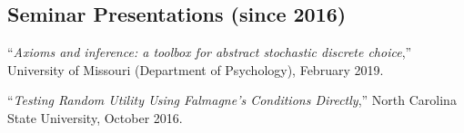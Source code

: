 \documentclass[12pt]{article}
\begin{document}




\subsection*{Seminar Presentations (since 2016)}

``{\it Axioms and inference: a toolbox for abstract stochastic discrete choice},''
University of Missouri (Department of Psychology), February 2019.

``{\it Testing Random Utility Using Falmagne's Conditions Directly},''
North Carolina State University, October 2016.






\end{document}

